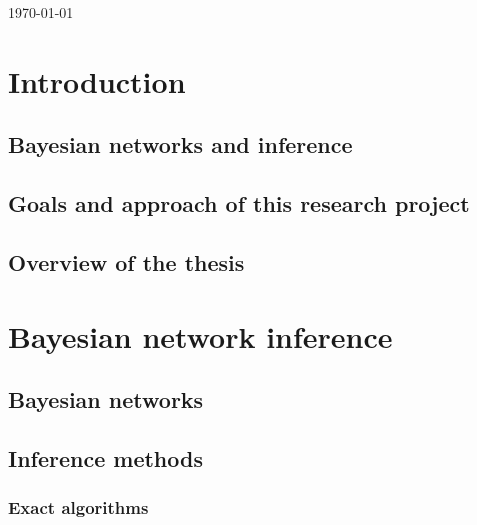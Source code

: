 \documentclass[a4paper, twoside, 11pt]{report}
\theoremstyle{plain}
\theoremstyle{definition}
\theoremstyle{remark}
\begin{document}
\begin{titlepage}
\vfill

\large \textsc{\today}

	
\end{titlepage}


\pagestyle{plain}






\begin{abstract}
\end{abstract}


\tableofcontents

\clearpage


\restoregeometry



\chapter{Introduction}


\section{Bayesian networks and inference}
\section{Goals and approach of this research project}
\section{Overview of the thesis}


\chapter{Bayesian network inference}
\section{Bayesian networks}
\section{Inference methods}


\subsection{Exact algorithms}
\end{document}
